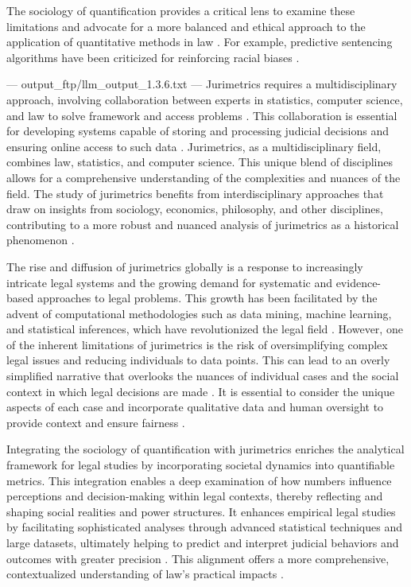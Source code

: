 The sociology of quantification provides a critical lens to examine these limitations and advocate for a more balanced and ethical approach to the application of quantitative methods in law \cite{10.1057/s41599-020-00557-0,10.1590/data.2022.65.3.267}. For example, predictive sentencing algorithms have been criticized for reinforcing racial biases \cite{10.1057/s41599-020-00557-0}.


---
output_ftp/llm_output_1.3.6.txt
---
Jurimetrics requires a multidisciplinary approach, involving collaboration between experts in statistics, computer science, and law to solve framework and access problems \cite{103390fi9040068}. This collaboration is essential for developing systems capable of storing and processing judicial decisions and ensuring online access to such data \cite{103390fi9040068}. Jurimetrics, as a multidisciplinary field, combines law, statistics, and computer science. This unique blend of disciplines allows for a comprehensive understanding of the complexities and nuances of the field. The study of jurimetrics benefits from interdisciplinary approaches that draw on insights from sociology, economics, philosophy, and other disciplines, contributing to a more robust and nuanced analysis of jurimetrics as a historical phenomenon \cite{loevinger1959}.

The rise and diffusion of jurimetrics globally is a response to increasingly intricate legal systems and the growing demand for systematic and evidence-based approaches to legal problems. This growth has been facilitated by the advent of computational methodologies such as data mining, machine learning, and statistical inferences, which have revolutionized the legal field \cite{10.1017/s0003975609000150,10.5040/9781350220645,zabala2019decades,loevinger1959,10.1515/9781400829699,10.1111/ilr.12067}. However, one of the inherent limitations of jurimetrics is the risk of oversimplifying complex legal issues and reducing individuals to data points. This can lead to an overly simplified narrative that overlooks the nuances of individual cases and the social context in which legal decisions are made \cite{10.1007/s11186-021-09453-1,10.1057/s41599-020-00557-0}. It is essential to consider the unique aspects of each case and incorporate qualitative data and human oversight to provide context and ensure fairness \cite{10.1007/s11186-021-09453-1,10.1057/s41599-020-00557-0}.

Integrating the sociology of quantification with jurimetrics enriches the analytical framework for legal studies by incorporating societal dynamics into quantifiable metrics. This integration enables a deep examination of how numbers influence perceptions and decision-making within legal contexts, thereby reflecting and shaping social realities and power structures. It enhances empirical legal studies by facilitating sophisticated analyses through advanced statistical techniques and large datasets, ultimately helping to predict and interpret judicial behaviors and outcomes with greater precision \cite{paiva2021, nunes2016_pages_91-92, nunes2016_pages_133-133}. This alignment offers a more comprehensive, contextualized understanding of law's practical impacts \cite{nunes2016_pages_100-101}.

